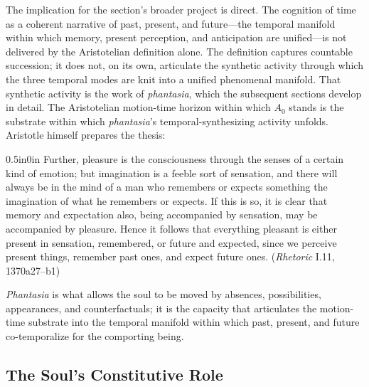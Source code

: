 The implication for the section's broader project is direct. The cognition of time as a coherent narrative of past, present, and future---the temporal manifold within which memory, present perception, and anticipation are unified---is not delivered by the Aristotelian definition alone. The definition captures countable succession; it does not, on its own, articulate the synthetic activity through which the three temporal modes are knit into a unified phenomenal manifold. That synthetic activity is the work of \textit{phantasia}, which the subsequent sections develop in detail. The Aristotelian motion-time horizon within which $A_0$ stands is the substrate within which \textit{phantasia}'s temporal-synthesizing activity unfolds. Aristotle himself prepares the thesis:
\begin{adjustwidth}{0.5in}{0in}
Further, pleasure is the consciousness through the senses of a certain kind of emotion; but imagination is a feeble sort of sensation, and there will always be in the mind of a man who remembers or expects something the imagination of what he remembers or expects. If this is so, it is clear that memory and expectation also, being accompanied by sensation, may be accompanied by pleasure. Hence it follows that everything pleasant is either present in sensation, remembered, or future and expected, since we perceive present things, remember past ones, and expect future ones. (\textit{Rhetoric} I.11, 1370a27--b1)
\end{adjustwidth}
\textit{Phantasia} is what allows the soul to be moved by absences, possibilities, appearances, and counterfactuals; it is the capacity that articulates the motion-time substrate into the temporal manifold within which past, present, and future co-temporalize for the comporting being.

\subsection{The Soul's Constitutive Role}


